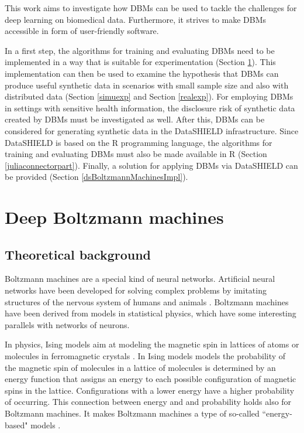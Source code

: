 \documentclass[12pt]{article}
\begin{document}
This work aims to investigate how DBMs can be used to tackle the challenges for deep learning on biomedical data. Furthermore, it strives to make DBMs accessible in form of user-friendly software.

In a first step, the algorithms for training and evaluating DBMs need to be implemented in a way that is suitable for experimentation (Section \ref{bmpart}).
This implementation can then be used to examine the hypothesis that DBMs can produce useful synthetic data in scenarios with small sample size and also with distributed data (Section \ref{simuexp} and Section \ref{realexp}).
For employing DBMs in settings with sensitive health information, the disclosure risk of synthetic data created by DBMs must be investigated as well.
After this, DBMs can be considered for generating synthetic data in the DataSHIELD infrastructure.
Since DataSHIELD is based on the R programming language, the algorithms for training and evaluating DBMs must also be made available in R (Section \ref{juliaconnectorpart}).
Finally, a solution for applying DBMs via DataSHIELD can be provided (Section \ref{dsBoltzmannMachinesImpl}).


\clearpage
\section{Deep Boltzmann machines}\label{bmpart}
\subsection{Theoretical background}\label{bmtheory}

Boltzmann machines \citep{ackley_boltzmann_1985} are a special kind of neural networks.
Artificial neural networks have been developed for solving complex problems by imitating structures of the nervous system of humans and animals \citep{mcculloch_logical_1943}.
Boltzmann machines have been derived from models in statistical physics, which have some interesting parallels with networks of neurons.

In physics, Ising models aim at modeling the magnetic spin in lattices of atoms or molecules in ferromagnetic crystals \citep{isingmodel}.
In Ising models models the probability of the magnetic spin of molecules in a lattice of molecules is determined by an energy function that assigns an energy to each possible configuration of magnetic spins in the lattice.
Configurations with a lower energy have a higher probability of occurring.
This connection between energy and and probability holds also for Boltzmann machines.
It makes Boltzmann machines a type of so-called ``energy-based" models \citep{ranzato_ebm}.
\end{document}
